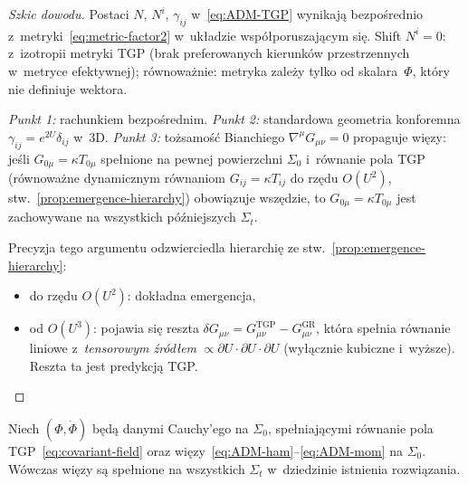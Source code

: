 \begin{proof}[Szkic dowodu]
Postaci $N$, $N^i$, $\gamma_{ij}$ w~\eqref{eq:ADM-TGP}
wynikaj\k{a} bezpo\'srednio z~metryki~\eqref{eq:metric-factor2}
w~uk\l{}adzie wsp\'o\l{}poruszaj\k{a}cym si\k{e}.
Shift $N^i = 0$: z~izotropii metryki TGP
(brak preferowanych kierunk\'ow przestrzennych
w~metryce efektywnej); r\'ownowa\.znie:
metryka zale\.zy tylko od skalara~$\Phi$,
kt\'ory nie definiuje wektora.

\smallskip\noindent
\emph{Punkt 1:} rachunkiem bezpo\'srednim.
\emph{Punkt 2:} standardowa geometria konforemna
$\gamma_{ij} = e^{2U}\delta_{ij}$ w~3D.
\emph{Punkt 3:} to\.zsamo\'s\'c Bianchiego
$\nabla^\mu G_{\mu\nu} = 0$ propaguje wi\k{e}zy:
je\'sli $G_{0\mu} = \kappa T_{0\mu}$ spe\l{}nione
na pewnej powierzchni $\Sigma_0$
i~r\'ownanie pola TGP (r\'ownowa\.zne dynamicznym
r\'ownaniom $G_{ij} = \kappa T_{ij}$
do rz\k{e}du $O(U^2)$, stw.~\ref{prop:emergence-hierarchy})
obowi\k{a}zuje wsz\k{e}dzie, to
$G_{0\mu} = \kappa T_{0\mu}$ jest zachowywane
na wszystkich p\'o\'zniejszych $\Sigma_t$.

Precyzja tego argumentu odzwierciedla hierarchi\k{e}
ze stw.~\ref{prop:emergence-hierarchy}:
\begin{itemize}[nosep]
  \item do rz\k{e}du $O(U^2)$: dok\l{}adna emergencja,
  \item od $O(U^3)$: pojawia si\k{e} reszta
    $\delta G_{\mu\nu} = G_{\mu\nu}^{\mathrm{TGP}}
    - G_{\mu\nu}^{\mathrm{GR}}$,
    kt\'ora spe\l{}nia r\'ownanie liniowe
    z~\emph{tensorowym \'zr\'od\l{}em} $\propto \partial U
    \cdot \partial U \cdot \partial U$ (wy\l{}\k{a}cznie
    kubiczne i~wy\.zsze). Reszta ta jest predykcj\k{a} TGP.
\end{itemize}
\end{proof}

\begin{proposition}%
\label{prop:ADM-constraint-propagation}
Niech $(\Phi, \dot\Phi)$ b\k{e}d\k{a} danymi Cauchy'ego na $\Sigma_0$,
spe\l{}niaj\k{a}cymi r\'ownanie pola TGP~\eqref{eq:covariant-field}
oraz wi\k{e}zy~\eqref{eq:ADM-ham}--\eqref{eq:ADM-mom}
na $\Sigma_0$. W\'owczas wi\k{e}zy s\k{a} spe\l{}nione
na wszystkich $\Sigma_t$ w~dziedzinie istnienia rozwi\k{a}zania.
\end{proposition}

